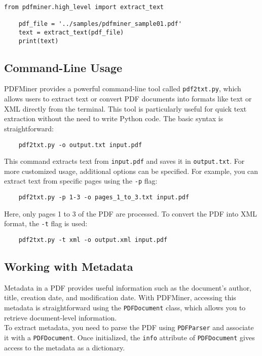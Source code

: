 \begin{lstlisting}[caption={Extracting Text from a PDF with pdfminer.six}, label={lst:extract-pdf-text}]
	from pdfminer.high_level import extract_text
	
	pdf_file = '../samples/pdfminer_sample01.pdf'
	text = extract_text(pdf_file)
	print(text)
\end{lstlisting}

\subsection{Command-Line Usage}
PDFMiner provides a powerful command-line tool called \texttt{pdf2txt.py}, which allows users to extract text or convert PDF documents into formats like text or XML directly from the terminal. This tool is particularly useful for quick text extraction without the need to write Python code. The basic syntax is straightforward:

\begin{verbatim}
	pdf2txt.py -o output.txt input.pdf
\end{verbatim}

This command extracts text from \texttt{input.pdf} and saves it in \texttt{output.txt}. For more customized usage, additional options can be specified. For example, you can extract text from specific pages using the \texttt{-p} flag:

\begin{verbatim}
	pdf2txt.py -p 1-3 -o pages_1_to_3.txt input.pdf
\end{verbatim}

Here, only pages 1 to 3 of the PDF are processed. To convert the PDF into XML format, the \texttt{-t} flag is used: \cite{Shinyama:2019}

\begin{verbatim}
	pdf2txt.py -t xml -o output.xml input.pdf
\end{verbatim}

\subsection{Working with Metadata}
Metadata in a PDF provides useful information such as the document's author, title, creation date, and modification date. With PDFMiner, accessing this metadata is straightforward using the \texttt{PDFDocument} class, which allows you to retrieve document-level information.\\

To extract metadata, you need to parse the PDF using \texttt{PDFParser} and associate it with a \texttt{PDFDocument}. Once initialized, the \texttt{info} attribute of \texttt{PDFDocument} gives access to the metadata as a dictionary.\cite{Shinyama:2019} \\

